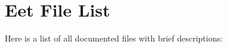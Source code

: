 \section{Eet File List}
Here is a list of all documented files with brief descriptions:\begin{CompactList}
\item{}
\item{}
\end{CompactList}
